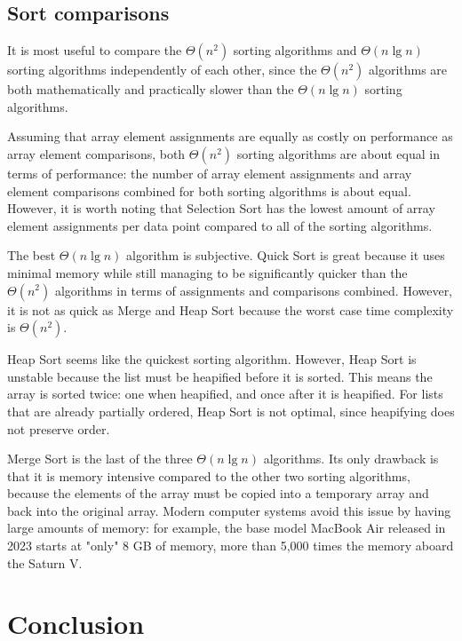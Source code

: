 \documentclass[10pt,fleqn]{article}
\begin{document}
\subsection{Sort comparisons}

It is most useful to compare the $\Theta(n^2)$ sorting algorithms and $\Theta(n\lg n)$ sorting algorithms independently of each other, since the $\Theta(n^2)$ algorithms are both mathematically and practically slower than the $\Theta(n\lg n)$ sorting algorithms.

Assuming that array element assignments are equally as costly on performance as array element comparisons, both $\Theta(n^2)$ sorting algorithms are about equal in terms of performance: the number of array element assignments and array element comparisons combined for both sorting algorithms is about equal. However, it is worth noting that Selection Sort has the lowest amount of array element assignments per data point compared to all of the sorting algorithms.

The best $\Theta(n\lg n)$ algorithm is subjective. Quick Sort is great because it uses minimal memory while still managing to be significantly quicker than the $\Theta(n^2)$ algorithms in terms of assignments and comparisons combined. However, it is not as quick as Merge and Heap Sort because the worst case time complexity is $\Theta(n^2)$.

Heap Sort seems like the quickest sorting algorithm. However, Heap Sort is unstable because the list must be heapified before it is sorted. This means the array is sorted twice: one when heapified, and once after it is heapified. For lists that are already partially ordered, Heap Sort is not optimal, since heapifying does not preserve order.

Merge Sort is the last of the three $\Theta(n\lg n)$ algorithms. Its only drawback is that it is memory intensive compared to the other two sorting algorithms, because the elements of the array must be copied into a temporary array and back into the original array. Modern computer systems avoid this issue by having large amounts of memory: for example, the base model MacBook Air released in 2023 starts at "only" 8 GB of memory, more than 5,000 times the memory aboard the Saturn V.

\section{Conclusion}
\end{document}
